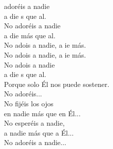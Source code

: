 \begin{cancion}%
	 adoréis a nadie\\
	a die s que al. \\
No adoréis a nadie\\
	a die más que al.\\
	No adois a nadie, a ie más. \\
	No adois a nadie, a ie más. \\
	No adois a nadie \\
	a die s que al. \\
Porque solo Él nos puede sostener.\\
No adoréis...\\
No fijéis los ojos\\
en nadie más que en Él...\\
No esperéis a nadie,\\
a nadie más que a Él...\\
No adoréis a nadie...\\
\end{cancion}%
